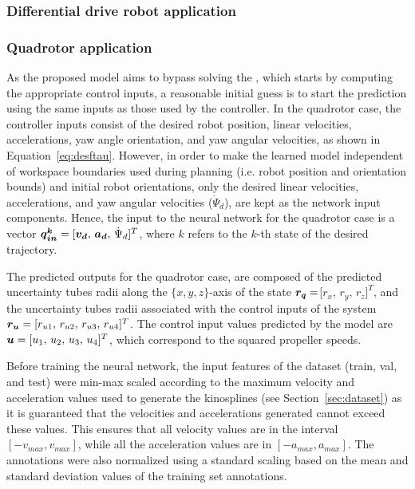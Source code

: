 \subsubsection{Differential drive robot application}

\subsubsection{Quadrotor application}

As the proposed model aims to bypass solving the , which starts by computing the appropriate control inputs, a reasonable initial guess is to start the prediction using the same inputs as those used by the controller.
In the quadrotor case, the controller inputs consist of the desired robot position, linear velocities, accelerations, yaw angle orientation, and yaw angular velocities, as shown in Equation~\ref{eq:desftau}. 
However, in order to make the learned model independent of workspace boundaries used during planning (i.e. robot position and orientation bounds) and initial robot orientations, only the desired linear velocities, accelerations, and yaw angular velocities ($\Dot{\Psi}_d$), are kept as the network input components.
Hence, the input to the neural network for the quadrotor case is a vector $\boldsymbol{\boldsymbol{q}_{in}^k} = [\boldsymbol{v_d} ,\, \boldsymbol{a_d} ,\, \Dot{\Psi}_d]^T$, where $k$ refers to the $k$-th state of the desired trajectory.

The predicted outputs for the quadrotor case, are composed of the predicted uncertainty tubes radii along the $\{x,y,z\}$-axis of the state $\boldsymbol{r_q}=$[$r_{x},\,r_{y},\,r_{z}]^T$, and the uncertainty tubes radii associated with the control inputs of the system $\boldsymbol{r_u} = [r_{u1},\,r_{u2},\,r_{u3},\,r_{u4}]^T$.
The control input values predicted by the model are $\boldsymbol{u} = [u_1 ,\, u_2 ,\, u_3 ,\, u_4]^T$, which correspond to the squared propeller speeds.

Before training the neural network, the input features of the dataset (train, val, and test) were min-max scaled according to the maximum velocity and acceleration values used to generate the kinosplines (see Section~\ref{sec:dataset}) as it is guaranteed that the velocities and accelerations generated cannot exceed these values. 
This ensures that all velocity values are in the interval $[-v_{max}, v_{max}]$, while all the acceleration values are in $[-a_{max}, a_{max}]$. 
The annotations were also normalized using a standard scaling based on the mean and standard deviation values of the training set annotations.

